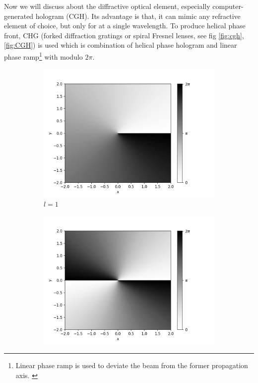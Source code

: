 \documentclass[11pt,a4paper]{article}
\numberwithin{equation}{section}
\begin{document}
Now we will discuss about the diffractive optical element, especially computer-generated hologram (CGH). Its advantage is that, it can mimic any refractive element of choice, but only for at a single wavelength. To produce helical phase front, CHG (forked diffraction gratings or spiral Fresnel lenses, see fig \ref{fig:cgh},\ref{fig:CGH}) is used which is combination of helical phase hologram and linear phase ramp\footnote{Linear phase ramp is used to deviate the beam from the former propagation axis. \cite{doe}} with modulo $2\pi$. \cite{yao 11} 

\begin{figure}[H]
	\begin{subfigure}[H]{0.3\textwidth}
		\centering
		\includegraphics[width=\textwidth]{cgh_l1.png}
		\caption{$l=1$}
		\label{fig:cgh,l=1}
	\end{subfigure}
	\hfil
	\begin{subfigure}[H]{0.3\textwidth}
		\centering
		\includegraphics[width=\textwidth]{cgh_l2.png}

\end{subfigure}
\end{figure}
\end{document}
